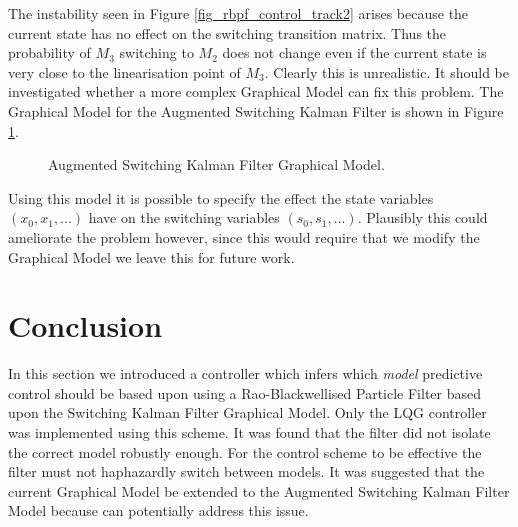 The instability seen in Figure \ref{fig_rbpf_control_track2} arises because the current state has no effect on the switching transition matrix. Thus the probability of $M_3$ switching to $M_2$ does not change even if the current state is very close to the linearisation point of $M_3$. Clearly this is unrealistic. It should be investigated whether a more complex Graphical Model can fix this problem. The Graphical Model for the Augmented Switching Kalman Filter \cite{barber} is shown in Figure \ref{fig_gm_augmented}. 
\begin{figure}[H] 
\centering
{}
\caption{Augmented Switching Kalman Filter Graphical Model.}
\label{fig_gm_augmented}
\end{figure}
Using this model it is possible to specify the effect the state variables $(x_0,x_1,...)$ have on the switching variables $(s_0, s_1,...)$. Plausibly this could ameliorate the problem however, since this would require that we modify the Graphical Model we leave this for future work.  

\section{Conclusion}
In this section we introduced a controller which infers which \textit{model} predictive control should be based upon using a Rao-Blackwellised Particle Filter based upon the Switching Kalman Filter Graphical Model. Only the LQG controller was implemented using this scheme. It was found that the filter did not isolate the correct model robustly enough. For the control scheme to be effective the filter must not haphazardly switch between models. It was suggested that the current Graphical Model be extended to the Augmented Switching Kalman Filter Model because  can potentially address this issue.
